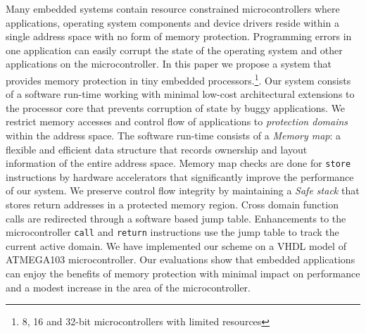 \noindent
Many embedded systems contain resource constrained microcontrollers where applications, operating system components and device drivers reside within a single address space with no form of memory protection.
%
Programming errors in one application can easily corrupt the state of the operating system and other applications on the microcontroller.
%
In this paper we propose a system that provides memory protection in tiny embedded processors.\footnote{8, 16 and 32-bit microcontrollers with limited resources}.
%
Our system consists of a software run-time working with minimal low-cost architectural extensions to the processor core that prevents corruption of state by buggy applications.
%
We restrict memory accesses and control flow of applications to \textit{protection domains} within the address space.
%
The software run-time consists of a \textit{Memory map}: a flexible and efficient data structure that records ownership and layout information of the entire address space.
%
Memory map checks are done for \texttt{store} instructions by hardware accelerators that significantly improve the performance of our system.
%
We preserve control flow integrity by maintaining a \textit{Safe stack} that stores return addresses in a protected memory region.
%
Cross domain function calls are redirected through a software based jump table.
%
Enhancements to the microcontroller \texttt{call} and \texttt{return} instructions use the jump table to track the current active domain.
%
We have implemented our scheme on a VHDL model of ATMEGA103 microcontroller.
%
Our evaluations show that embedded applications can enjoy the benefits of memory protection with minimal impact on performance and a modest increase in the area of the microcontroller.
